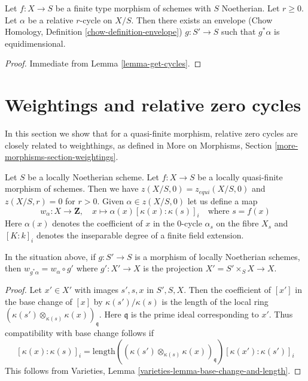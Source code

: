 \begin{lemma}
\label{lemma-get-equidimensional-cycles}
Let $f : X \to S$ be a finite type morphism of schemes with $S$ Noetherian.
Let $r \geq 0$. Let $\alpha$ be a relative $r$-cycle on $X/S$. Then there
exists an envelope
(Chow Homology, Definition \ref{chow-definition-envelope})
$g : S' \to S$ such that $g^*\alpha$ is equidimensional.
\end{lemma}

\begin{proof}
Immediate from Lemma \ref{lemma-get-cycles}.
\end{proof}





\section{Weightings and relative zero cycles}
\label{section-weightings}

\noindent
In this section we show that for a quasi-finite morphism,
relative zero cycles are closely related to weighthings, as defined in
More on Morphisms, Section \ref{more-morphisms-section-weightings}.

\medskip\noindent
Let $S$ be a locally Noetherian scheme. Let $f : X \to S$ be a locally
quasi-finite morphism of schemes. Then we have $z(X/S, 0) = z_{equi}(X/S, 0)$
and $z(X/S, r) = 0$ for $r > 0$. Given $\alpha \in z(X/S, 0)$ let us
define a map
$$
w_\alpha : X \longrightarrow \mathbf{Z},\quad
x \mapsto \alpha(x) [\kappa(x) : \kappa(s)]_i \quad\text{where }s = f(x)
$$
Here $\alpha(x)$ denotes the coefficient of $x$ in the $0$-cycle
$\alpha_s$ on the fibre $X_s$ and $[K : k]_i$ denotes the inseparable
degree of a finite field extension.

\begin{lemma}
\label{lemma-weightings-pre}
In the situation above, if $g : S' \to S$ is a morphism of locally
Noetherian schemes, then $w_{g^*\alpha} = w_\alpha \circ g'$ where
$g' : X' \to X$ is the projection $X' = S' \times_S X \to X$.
\end{lemma}

\begin{proof}
Let $x' \in X'$ with images $s', s, x$ in $S', S, X$.
Then the coefficient of $[x']$ in
the base change of $[x]$ by $\kappa(s')/\kappa(s)$ is the length of
the local ring $(\kappa(s') \otimes_{\kappa(s)} \kappa(x))_\mathfrak q$.
Here $\mathfrak q$ is the prime ideal corresponding to $x'$.
Thus compatibility with base change follows if
$$
[\kappa(x) : \kappa(s)]_i =
\text{length}((\kappa(s') \otimes_{\kappa(s)} \kappa(x))_\mathfrak q)
[\kappa(x') : \kappa(s')]_i
$$
This follows from
Varieties, Lemma \ref{varieties-lemma-base-change-and-length}.
\end{proof}

